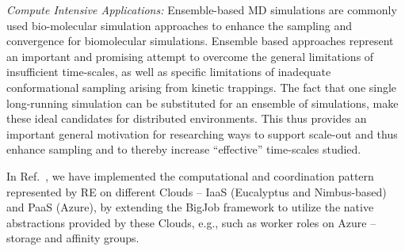 \documentclass[10pt,conference,final,letterpaper,twoside,twocolumn,]{IEEEtran}
\begin{document}
{\it Compute Intensive Applications:} Ensemble-based MD simulations
are commonly used bio-molecular simulation approaches to enhance the
sampling and convergence for biomolecular simulations.  Ensemble based
approaches represent an important and promising attempt to overcome
the general limitations of insufficient time-scales, as well as
specific limitations of inadequate conformational sampling arising
from kinetic trappings.  The fact that one single long-running
simulation can be substituted for an ensemble of simulations, make
these ideal candidates for distributed environments.  This thus
provides an important general motivation for researching ways to
support scale-out and thus enhance sampling and to thereby increase
``effective'' time-scales studied.

In Ref.~\cite{ccgrid10, cloudcom10}, we have implemented the
computational and coordination pattern represented by RE on different
Clouds -- IaaS (Eucalyptus and Nimbus-based) and PaaS (Azure), by
extending the BigJob framework to utilize the native abstractions
provided by these Clouds, e.g., such as worker roles on Azure --
storage and affinity groups.





\end{document}
